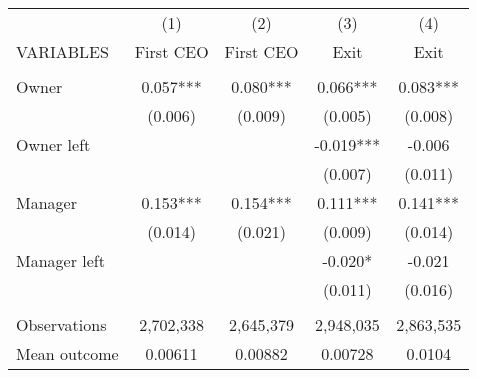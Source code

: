 \begin{tabular}{lcccc} \hline
 & (1) & (2) & (3) & (4) \\
VARIABLES & First CEO & First CEO & Exit & Exit \\ \hline
 &  &  &  &  \\
Owner & 0.057*** & 0.080*** & 0.066*** & 0.083*** \\
 & (0.006) & (0.009) & (0.005) & (0.008) \\
Owner left &  &  & -0.019*** & -0.006 \\
 &  &  & (0.007) & (0.011) \\
Manager & 0.153*** & 0.154*** & 0.111*** & 0.141*** \\
 & (0.014) & (0.021) & (0.009) & (0.014) \\
Manager left &  &  & -0.020* & -0.021 \\
 &  &  & (0.011) & (0.016) \\
 &  &  &  &  \\
Observations & 2,702,338 & 2,645,379 & 2,948,035 & 2,863,535 \\
 Mean outcome & 0.00611 & 0.00882 & 0.00728 & 0.0104 \\ \hline
\end{tabular}
